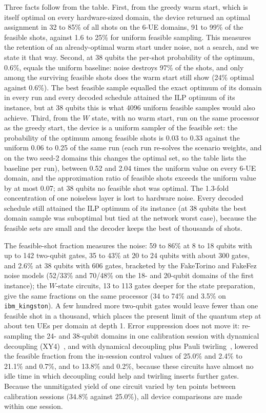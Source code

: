 Three facts follow from the table. First, from the greedy warm start, which is itself optimal on every hardware-sized
domain, the device returned an optimal assignment in 32 to 85\% of all shots on the 6-UE domains, 91 to 99\% of the
feasible shots, against 1.6 to 25\% for uniform feasible sampling. This measures the retention of an already-optimal
warm start under noise, not a search, and we state it that way. Second, at 38 qubits the per-shot probability of the
optimum, 0.6\%, equals the uniform baseline: noise destroys 97\% of the shots, and only among the surviving feasible
shots does the warm start still show (24\% optimal against 0.6\%). The best feasible sample equalled the exact optimum
of its domain in every run and every decoded schedule attained the ILP optimum of its instance, but at 38 qubits this
is what 4096 uniform feasible samples would also achieve. Third, from the $W$ state, with no warm start, run on the same processor as the greedy start, the device is a uniform sampler of the
feasible set: the probability of the optimum among feasible shots is 0.03 to 0.33 against the uniform 0.06 to 0.25 of
the same run (each run re-solves the scenario weights, and on the two seed-2 domains this changes the optimal set, so
the table lists the baseline per run), between 0.52 and 2.04 times the uniform value on every 6-UE domain, and the
approximation ratio of feasible shots exceeds the uniform value by at most 0.07; at 38 qubits no feasible shot was optimal. The 1.3-fold concentration of one
noiseless layer is lost to hardware noise. Every decoded schedule still attained the ILP optimum of its instance
(at 38 qubits the best domain sample was suboptimal but tied at the network worst case), because the feasible sets
are small and the decoder keeps the best of thousands of shots.

The feasible-shot fraction measures the noise: 59 to 86\% at 8 to 18 qubits with up to 142 two-qubit gates, 35 to 43\%
at 20 to 24 qubits with about 300 gates, and 2.6\% at 38 qubits with 606 gates, bracketed by the FakeTorino and FakeFez noise
models (52/33\% and 70/48\% on the 18- and 20-qubit domains of the first instance); the $W$-state circuits, 13 to 113 gates deeper for the state preparation, give the same
fractions on the same processor (34 to 74\% and 3.5\% on \texttt{ibm\_kingston}).
A few hundred more two-qubit gates would leave fewer than one feasible shot in a thousand, which places the present
limit of the quantum step at about ten UEs per domain at depth 1. Error suppression does not move it: re-sampling the
24- and 38-qubit domains in one calibration session with dynamical decoupling (XY4)~\cite{Viola1999}, and with
dynamical decoupling plus Pauli twirling~\cite{Wallman2016}, lowered the feasible fraction from the in-session control
values of 25.0\% and 2.4\% to 21.1\% and 0.7\%, and to 13.8\% and 0.2\%, because these circuits have almost no idle time
in which decoupling could help and twirling inserts further gates. Because the unmitigated yield of one circuit varied by ten
points between calibration sessions (34.8\% against 25.0\%), all device comparisons are made within one session.

